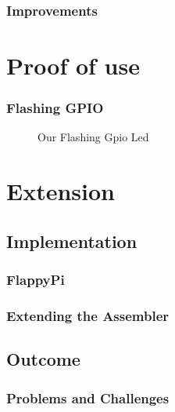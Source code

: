 \documentclass{beamer}
\begin{document}

\begin{frame}
\frametitle{Improvements}




\end{frame}

\section{Proof of use}
\begin{frame}
\frametitle{Flashing GPIO}

\begin{figure}
\caption{Our Flashing Gpio Led}
\end{figure}


\end{frame}
\section{Extension}

\subsection{Implementation}

\begin{frame}
\frametitle{FlappyPi}





\end{frame}

\begin{frame}
\frametitle{Extending the Assembler}




\end{frame}
\subsection{Outcome}

\begin{frame}
\frametitle{Problems and Challenges}





\end{frame}
\end{document}
